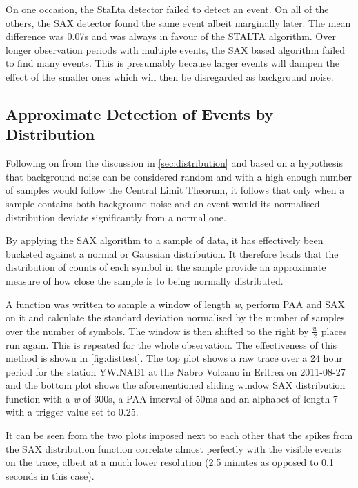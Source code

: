 \documentclass[../report.tex]{subfiles}
\begin{document}
	On one occasion, the StaLta detector failed to detect an event.  On all of the others, the SAX detector found the same event albeit marginally later.  The mean difference was 0.07s and was always in favour of the STALTA algorithm.  Over longer observation periods with multiple events, the SAX based algorithm failed to find many events.  This is presumably because larger events will dampen the effect of the smaller ones which will then be disregarded as background noise.

\subsection{Approximate Detection of Events by Distribution}

	Following on from the discussion in \cref{sec:distribution} and based on a hypothesis that background noise can be considered random and with a high enough number of samples would follow the Central Limit Theorum, it follows that only when a sample contains both background noise and an event would its normalised distribution deviate significantly from a normal one.
	
	By applying the SAX algorithm to a sample of data, it has effectively been bucketed against a normal or Gaussian distribution.  It therefore leads that the distribution of counts of each symbol in the sample provide an approximate measure of how close the sample is to being normally distributed.
	
	A function was written to sample a window of length \textit{w}, perform PAA and SAX on it and calculate the standard deviation normalised by the number of samples over the number of symbols.  The window is then shifted to the right by $\frac{w}{2}$ places run again.  This is repeated for the whole observation.  The effectiveness of this method is shown in \cref{fig:disttest}.  The top plot shows a raw trace over a 24 hour period for the station YW.NAB1 at the Nabro Volcano in Eritrea on 2011-08-27 \citep{eritrea1} and the bottom plot shows the aforementioned sliding window SAX distribution function with a \textit{w} of 300s, a PAA interval of 50ms and an alphabet of length 7 with a trigger value set to 0.25.
	
	It can be seen from the two plots imposed next to each other that the spikes from the SAX distribution function correlate almost perfectly with the visible events on the trace, albeit at a much lower resolution (2.5 minutes as opposed to 0.1 seconds in this case).
	
\end{document}
